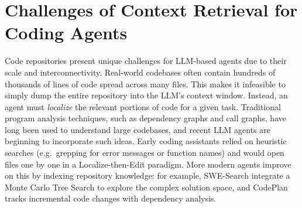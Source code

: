 \section{Challenges of Context Retrieval for Coding Agents}
\label{sec:ch1_bg}



Code repositories present unique challenges for LLM-based agents due to their scale and interconnectivity. Real-world codebases often contain hundreds of thousands of lines of code spread across many files. This makes it infeasible to simply dump the entire repository into the LLM’s context window. Instead, an agent must \emph{localize} the relevant portions of code for a given task. Traditional program analysis techniques, such as dependency graphs and call graphs, have long been used to understand large codebases, and recent LLM agents are beginning to incorporate such ideas. Early coding assistants relied on heuristic searches (e.g.\ grepping for error messages or function names) and would open files one by one in a Localize-then-Edit paradigm. More modern agents improve on this by indexing repository knowledge: for example, SWE-Search \cite{antoniades2025swesearchenhancingsoftwareagents} integrate a Monte Carlo Tree Search to explore the complex solution space, and CodePlan \cite{bairi2023codeplanrepositorylevelcodingusing} tracks incremental code changes with dependency analysis.

